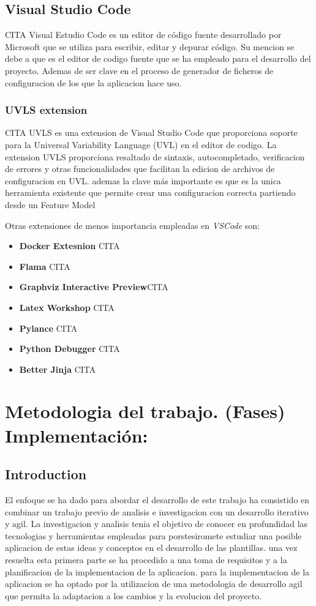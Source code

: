 \documentclass[12pt, a4paper, twoside]{article}
\begin{document}
\subsection{Visual Studio Code}
CITA 
Visual Estudio Code es un editor de código fuente desarrollado por Microsoft que se utiliza para escribir, editar y depurar código.
Su mencion se debe a que es el editor de codigo fuente que se ha empleado para el desarrollo del proyecto. Ademas de ser clave en el proceso de generador de ficheros de configuracion
de los que la aplicacion hace uso.
\subsubsection{UVLS extension}
CITA
UVLS es una extension de Visual Studio Code que proporciona soporte para la Universal Variability Language (UVL) en el editor de codigo.
La extension UVLS proporciona resaltado de sintaxis, autocompletado, verificacion de errores y otras funcionalidades que facilitan la edicion de archivos de configuracion en UVL.
ademas la clave más importante es que es la unica herramienta existente que permite crear una configuracion correcta partiendo desde un Feature Model


Otras extensiones de menos importancia empleadas en \textit{VSCode} son:
\begin{itemize}
    \item \textbf{Docker Extesnion} CITA 
    \item \textbf{Flama} CITA 
    \item \textbf{Graphviz Interactive Preview}CITA 
    \item \textbf{Latex Workshop} CITA 
    \item \textbf{Pylance} CITA 
    \item \textbf{Python Debugger} CITA 
    \item \textbf{Better Jinja} CITA 
\end{itemize}





\section{Metodologia del trabajo. (Fases) Implementación:}
\subsection{Introduction}
El enfoque se ha dado para abordar el desarrollo de este trabajo ha consistido en combinar un trabajo previo de analisis e investigacion con un desarrollo iterativo y agil.
La investigacion y analisis tenia el objetivo de conocer en profundidad las tecnologias y herramientas empleadas 
para porstesiromete estudiar una posible aplicacion de estas ideas y conceptos en el desarrollo de las plantillas.
una vez resuelta esta primera parte se ha procedido a una toma de requisitos y a la planificacion de la implementacion de la aplicacion.
para la implementacion de la aplicacion se ha optado por la utilizacion de una metodologia de desarrollo agil que permita la adaptacion a los cambios y la evolucion del proyecto.
\end{document}

